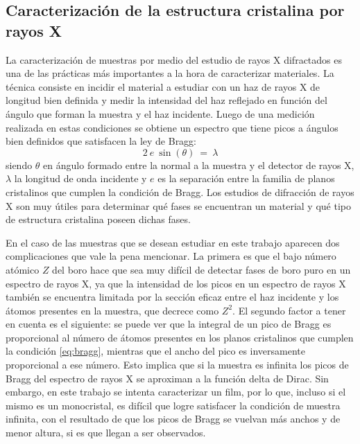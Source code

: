 \subsection{Caracterización de la estructura cristalina por rayos X}\label{SS:rayos10}
La caracterización de muestras por medio del estudio de rayos X difractados es una de las prácticas más importantes a la hora de caracterizar materiales. La técnica consiste en incidir el material a estudiar con un haz de rayos X de longitud bien definida y medir la intensidad del haz reflejado en función del ángulo que forman la muestra y el haz incidente. Luego de una medición realizada en estas condiciones se obtiene un espectro que tiene picos a ángulos bien definidos que satisfacen la ley de Bragg:
\begin{equation}
  2 \ e \ \sin(\theta) \ = \ \lambda
  \label{eq:bragg}
\end{equation}
\noindent
siendo $\theta$ en ángulo formado entre la normal a la muestra y el detector de rayos X, $\lambda$ la longitud de onda incidente y $e$ es la separación entre la familia de planos cristalinos que cumplen la condición de Bragg. Los estudios de difracción de rayos X son muy útiles para determinar qué fases se encuentran un material y qué tipo de estructura cristalina poseen dichas fases.

En el caso de las muestras que se desean estudiar en este trabajo aparecen dos complicaciones que vale la pena mencionar. La primera es que el bajo número atómico $Z$ del boro hace que sea muy difícil de detectar fases de boro puro en un espectro de rayos X, ya que la intensidad de los picos en un espectro de rayos X también se encuentra limitada por la sección eficaz entre el haz incidente y los átomos presentes en la muestra, que decrece como $Z^2$. El segundo factor a tener en cuenta es el siguiente: se puede ver que la integral de un pico de Bragg es proporcional al número de átomos presentes en los planos cristalinos que cumplen la condición \ref{eq:bragg}, mientras que el ancho del pico es inversamente proporcional a ese número. Esto implica que si la muestra es infinita los picos de Bragg del espectro de rayos X se aproximan a la función delta de Dirac. Sin embargo, en este trabajo se intenta caracterizar un film, por lo que, incluso si el mismo es un monocristal, es difícil que  logre satisfacer la condición de muestra infinita, con el resultado de que los picos de Bragg se vuelvan más anchos y de menor altura, si es que llegan a ser observados.

